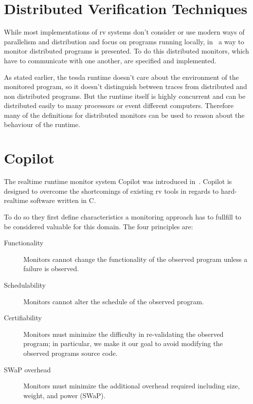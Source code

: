 \section{Distributed Verification Techniques}
\label{sec:related:distributed}

While most implementations of \gls{rv} systems don't consider or use modern ways of parallelism and distribution and focus on programs running locally, in~\cite{Mostafa2015} a way to monitor distributed programs is presented.
To do this distributed monitors, which have to communicate with one another, are specified and implemented.

As stated earlier, the \gls{tessla} runtime doesn't care about the environment of the monitored program, so it doesn't distinguish between traces from distributed and non distributed programs.
But the runtime itself is highly concurrent and can be distributed easily to many processors or event different computers.
Therefore many of the definitions for distributed monitors can be used to reason about the behaviour of the runtime.


\section{Copilot}
\label{sec:related:copilot}

The realtime runtime monitor system Copilot was introduced in~\cite{Pike2010}.
Copilot is designed to overcome the shortcomings of existing \gls{rv} tools in regards to hard-realtime software written in C.

To do so they first define characteristics a monitoring approach has to fullfill to be considered valuable for this domain.
The four principles are:

\begin{description}
  \item[Functionality] Monitors cannot change the functionality of the observed program unless a failure is observed.
  \item[Schedulability] Monitors cannot alter the schedule of the observed program.
  \item[Certifiability] Monitors must minimize the difficulty in re-validating the observed program; in particular, we make it our goal to avoid modifying the observed programs source code.
  \item[SWaP overhead] Monitors must minimize the additional overhead required including size, weight, and power (SWaP).
\end{description}

